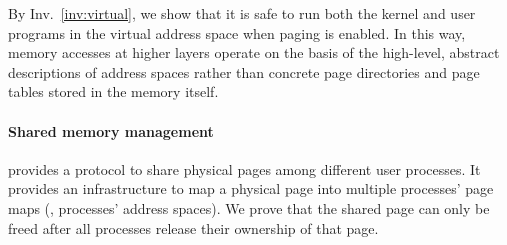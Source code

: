 {By Inv.~\ref{inv:virtual}, we show that it is safe to
run both the kernel and user programs in the virtual 
address space when paging is enabled.
In this way, memory accesses at higher layers
operate on the basis of
the high-level, abstract descriptions of address spaces
rather than concrete page directories and page tables stored in the memory
itself.


\vspace{-3pt}
\paragraph{Shared memory management} provides a protocol to share physical
pages among different user processes. 
It provides an infrastructure to map a physical page into multiple
processes' page maps (\ie, processes' address spaces).
We prove that the shared page can only be freed after 
all processes release their ownership of that page.




\ignore{\begin{figure}
 = C, multicols=1] {source_code/enqueue.v}
\vspace{-5pt}
\caption{Specifications of local queue operations.}
\label{fig:exp:queue}
\vspace{-10pt}
\end{figure}}


}
